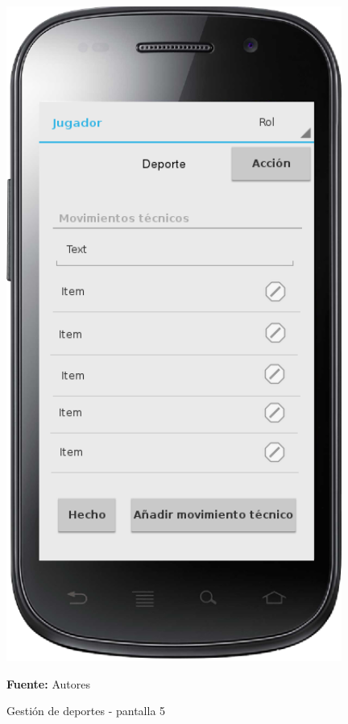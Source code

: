 \begin{figure}[!htb]
  \begin{center}
    \includegraphics[width=11cm]{./imagenes/UI/Deportes/gestion_deportes_5.png}
    \caption{Gestión de deportes - pantalla 5}
    \label{fig:gestion_deportes_5}
    \textbf{Fuente:}  Autores
  \end{center}
\end{figure}

